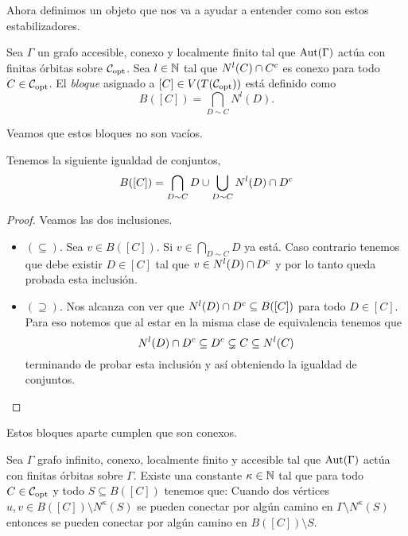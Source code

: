 \documentclass[tesis.tex]{subfiles}
\begin{document}
Ahora definimos un objeto que nos va a ayudar a entender como son estos estabilizadores.

\begin{deff}
	Sea $\Gamma$ un grafo accesible, conexo y localmente finito
	tal que $\text{Aut}(\Gamma)$ actúa con finitas órbitas sobre ${\cal C}_{\text{opt}}$.
	Sea $l \in \mathbb{N}$ tal que $N^l(C) \cap C^{c}$ es conexo para todo $C \in {\cal C}_{\text{opt}}$.
	El \emph{bloque} asignado a $[C] \in V(T({\cal C}_{\text{opt}}))$ está definido como
	\[
		B([C]) = \bigcap_{D \sim C} N^l (D).
	\]	
\end{deff}



Veamos que estos bloques no son vacíos.

\begin{lema}\label{lema_bloques_def_equiv}
	Tenemos la siguiente igualdad de conjuntos,
	\[
		B([C]) = \bigcap_{D \sim C} D \cup \bigcup_{D \sim C} N^l(D) \cap D^{c}
	\]
\end{lema}

\begin{proof}
	Veamos las dos inclusiones.
	
	\begin{itemize}
		\item \textbf{$(\subseteq)$}. 
		Sea $v \in B([C])$. 
		Si $v \in \bigcap_{D \sim C} D$ ya está. 
		Caso contrario tenemos que debe existir $D \in [C]$ tal que $v \in N^l(D) \cap D^{c}$ y por lo tanto queda probada esta inclusión.
		\item \textbf{$(\supseteq)$}. 
		Nos alcanza con ver que $ N^l(D) \cap D^{c} \subseteq B([C])$ para todo $D \in [C]$.
		Para eso notemos que al estar en la misma clase de equivalencia tenemos que 
		\[
			N^l(D) \cap D^{c} \subseteq D^{c} \subsetneq C \subseteq N^l(C)
		\]
		terminando de probar esta inclusión y así obteniendo la igualdad de conjuntos.
	\end{itemize}
\end{proof}




Estos bloques aparte cumplen que son conexos.

\begin{lema}\label{lema_conexion_B(C)}
	Sea $\Gamma$ grafo infinito, conexo, localmente finito y accesible tal que $\text{Aut}(\Gamma)$ actúa con finitas órbitas sobre $\Gamma$.
	Existe una constante $\kappa \in \mathbb{N}$ tal que para todo $C \in {\cal C}_{\text{opt}}$ y todo $S \subseteq B([C])$ tenemos que: 
	Cuando dos vértices $u,v \in B([C]) \setminus N^\kappa(S)$ se pueden conectar por algún camino en $\Gamma \setminus N^{\kappa}(S)$ entonces se pueden conectar por algún camino en $B([C]) \setminus S$. 
\end{lema}
\end{document}
